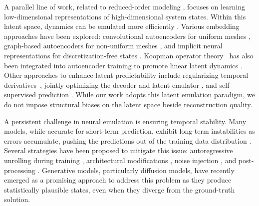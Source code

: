 A parallel line of work, related to reduced-order modeling \cite{benner2015survey}, focuses on learning low-dimensional representations of high-dimensional system states. Within this latent space, dynamics can be emulated more efficiently \cite{lusch2018deep, lui2019construction, wiewel2019latent, maulik2021reducedorder, han2022predicting, geneva2022transformers, chen2023crom, hemmasian2023reducedorder, li2025latent}. Various embedding approaches have been explored: convolutional autoencoders for uniform meshes \cite{wiewel2019latent, maulik2021reducedorder}, graph-based autoencoders for non-uniform meshes \cite{han2022predicting}, and implicit neural representations for discretization-free states \cite{chen2023crom, du2024conditional}. Koopman operator theory~\cite{koopman1931hamiltonian} has also been integrated into autoencoder training to promote linear latent dynamics \cite{yeung2019learning, geneva2022transformers}. Other approaches to enhance latent predictability include regularizing temporal derivatives~\cite{xie2024smooth}, jointly optimizing the decoder and latent emulator \cite{regazzoni2024learning}, and self-supervised prediction \cite{bardes2024revisiting}. While our work adopts this latent emulation paradigm, we do not impose structural biases on the latent space beside reconstruction quality.

A persistent challenge in neural emulation is ensuring temporal stability. Many models, while accurate for short-term prediction, exhibit long-term instabilities as errors accumulate, pushing the predictions out of the training data distribution \cite{mccabe2023stability}. Several strategies have been proposed to mitigate this issue: autoregressive unrolling during training \cite{lusch2018deep, geneva2020modeling, brandstetter2022message}, architectural modifications \cite{mccabe2023stability, raonic2023convolutional}, noise injection \cite{stachenfeld2022learned}, and post-processing \cite{lippe2023pderefiner, worrall2024spectral}. Generative models, particularly diffusion models, have recently emerged as a promising approach to address this problem \cite{lippe2023pderefiner, cachay2023dyffusion, kohl2024benchmarking, shysheya2024conditional, huang2024diffusionpde, price2025probabilistic} as they produce statistically plausible states, even when they diverge from the ground-truth solution.

